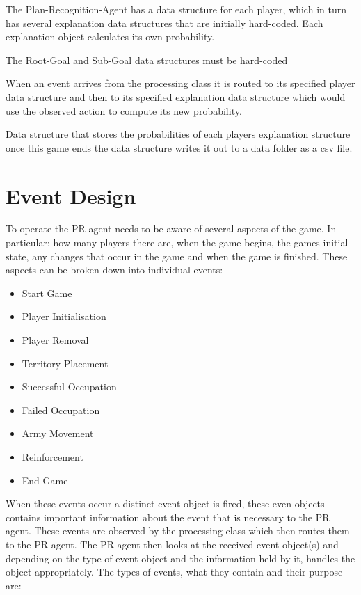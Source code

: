 \documentclass[parskip]{cs4rep}
\begin{document}
The Plan-Recognition-Agent has a data structure for each player, which in turn has several explanation data structures that are initially hard-coded. Each explanation object calculates its own probability.

The Root-Goal and Sub-Goal data structures must be hard-coded 

When an event arrives from the processing class it is routed to its specified player data structure and then to its specified explanation data structure which would use the observed action to compute its new probability.

Data structure that stores the probabilities of each players explanation structure once this game ends the data structure writes it out to a data folder as a csv file.

\newpage

\section{Event Design}

To operate the PR agent needs to be aware of several aspects of the game. In particular: how many players there are, when the game begins, the games initial state, any changes that occur in the game and when the game is finished. These aspects can be broken down into individual events:

\begin{itemize}
\item
Start Game
\item
Player Initialisation
\item
Player Removal
\item
Territory Placement
\item
Successful Occupation
\item
Failed Occupation
\item
Army Movement
\item
Reinforcement
\item
End Game
\end{itemize}

When these events occur a distinct event object is fired, these even objects contains important information about the event that is necessary to the PR agent. These events are observed by the processing class which then routes them to the PR agent. The PR agent then looks at the received event object(s) and depending on the type of event object and the information held by it, handles the object appropriately. The types of events, what they contain and their purpose are:
\end{document}
